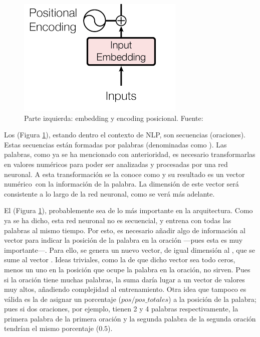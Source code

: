 \bigskip

\begin{figure}[H]
    \centering
    \includegraphics{imgs/trans_arq_1.png}
    \caption{Parte izquierda: embedding y encoding posicional. \scriptsize{Fuente: \parencite{transformers}}}
    \label{inputs_encoder}
\end{figure}
Los  (Figura \ref{inputs_encoder}), estando dentro el contexto de NLP, son secuencias (oraciones). Estas secuencias están formadas por palabras (denominadas como \fnm). Las palabras, como ya se ha mencionado con anterioridad, es necesario transformarlas en valores numéricos para poder ser analizadas y procesadas por una red neuronal. A esta transformación se la conoce como  y su resultado es un vector numérico\fnm\ con la información de la palabra. La dimensión de este vector será consistente a lo largo de la red neuronal, como se verá más adelante.
\addtocounter{footnote}{1}

El  (Figura \ref{inputs_encoder}), probablemente sea de lo más importante en la arquitectura. Como ya se ha dicho, esta red neuronal no es secuencial, y entrena con todas las palabras al mismo tiempo. Por esto, es necesario añadir algo de información al vector  para indicar la posición de la palabra en la oración ---pues esta es muy importante\fnm---. Para ello, se genera un nuevo vector, de igual dimensión al , que se sume al vector . Ideas triviales, como la de que dicho vector sea todo ceros, menos un uno en la posición que ocupe la palabra en la oración, no sirven. Pues si la oración tiene muchas palabras, la suma daría lugar a un vector de valores muy altos, añadiendo complejidad al entrenamiento. Otra idea que tampoco es válida es la de asignar un porcentaje ($pos/pos\_totales$) a la posición de la palabra; pues si dos oraciones, por ejemplo, tienen 2 y 4 palabras respectivamente, la primera palabra de la primera oración y la segunda palabra de la segunda oración tendrían el mismo porcentaje ($0.5$).

